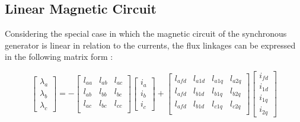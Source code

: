 \subsection{Linear Magnetic Circuit}

Considering the special case in which the magnetic circuit of the synchronous
generator is linear in relation to the currents, the flux linkages can be
expressed in the following matrix form \cite{siva2022modeling}:

\begin{equation}
    \begin{bmatrix}
        \lambda_a \\ \lambda_b \\ \lambda_c
    \end{bmatrix}
    =
    - \begin{bmatrix}
        l_{aa} & l_{ab} & l_{ac} \\
        l_{ab} & l_{bb} & l_{bc} \\
        l_{ac} & l_{bc} & l_{cc} \\
    \end{bmatrix}
    \begin{bmatrix}
        i_a \\ i_b \\ i_c
    \end{bmatrix}
    + \begin{bmatrix}
        l_{afd} & l_{a1d} & l_{a1q} & l_{a2q}\\
        l_{afd} & l_{b1d} & l_{b1q} & l_{b2q}\\
        l_{afd} & l_{b1d} & l_{c1q} & l_{c2q}\\
    \end{bmatrix}
    \begin{bmatrix}
        i_{fd} \\ i_{1d} \\ i_{1q} \\ i_{2q}
    \end{bmatrix}
    \label{eq:lin_circuit_stator}
\end{equation}

